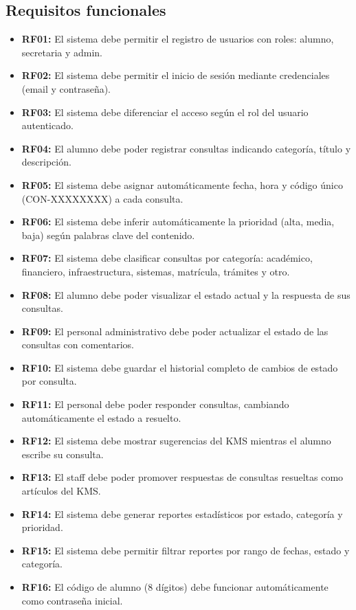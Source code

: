 \documentclass[12pt,a4paper]{article}
\begin{document}
	\subsection{Requisitos funcionales}
	\begin{itemize}
	\setlength{\itemindent}{1cm}
	\item \textbf{RF01:} El sistema debe permitir el registro de usuarios con roles: alumno, secretaria y admin.
	\item \textbf{RF02:} El sistema debe permitir el inicio de sesión mediante credenciales (email y contraseña).
	\item \textbf{RF03:} El sistema debe diferenciar el acceso según el rol del usuario autenticado.
	\item \textbf{RF04:} El alumno debe poder registrar consultas indicando categoría, título y descripción.
	\item \textbf{RF05:} El sistema debe asignar automáticamente fecha, hora y código único (CON-XXXXXXXX) a cada consulta.
	\item \textbf{RF06:} El sistema debe inferir automáticamente la prioridad (alta, media, baja) según palabras clave del contenido.
	\item \textbf{RF07:} El sistema debe clasificar consultas por categoría: académico, financiero, infraestructura, sistemas, matrícula, trámites y otro.
	\item \textbf{RF08:} El alumno debe poder visualizar el estado actual y la respuesta de sus consultas.
	\item \textbf{RF09:} El personal administrativo debe poder actualizar el estado de las consultas con comentarios.
	\item \textbf{RF10:} El sistema debe guardar el historial completo de cambios de estado por consulta.
	\item \textbf{RF11:} El personal debe poder responder consultas, cambiando automáticamente el estado a resuelto.
	\item \textbf{RF12:} El sistema debe mostrar sugerencias del KMS mientras el alumno escribe su consulta.
	\item \textbf{RF13:} El staff debe poder promover respuestas de consultas resueltas como artículos del KMS.
	\item \textbf{RF14:} El sistema debe generar reportes estadísticos por estado, categoría y prioridad.
	\item \textbf{RF15:} El sistema debe permitir filtrar reportes por rango de fechas, estado y categoría.
	\item \textbf{RF16:} El código de alumno (8 dígitos) debe funcionar automáticamente como contraseña inicial.

\end{itemize}
\end{document}

